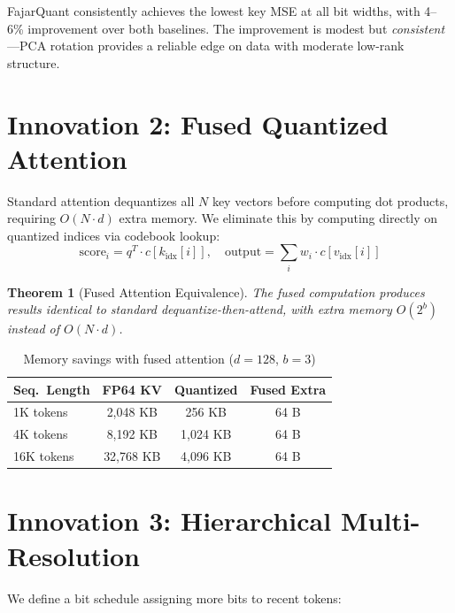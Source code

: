 \documentclass{article}
\newtheorem{theorem}{Theorem}
\begin{document}
FajarQuant consistently achieves the lowest key MSE at all bit widths, with 4--6\% improvement over both baselines. The improvement is modest but \textit{consistent}---PCA rotation provides a reliable edge on data with moderate low-rank structure.

\section{Innovation 2: Fused Quantized Attention}
\label{sec:fused}

Standard attention dequantizes all $N$ key vectors before computing dot products, requiring $O(N \cdot d)$ extra memory. We eliminate this by computing directly on quantized indices via codebook lookup:
\begin{equation}
\text{score}_i = q^T \cdot c[k_{\text{idx}}[i]], \quad
\text{output} = \sum_i w_i \cdot c[v_{\text{idx}}[i]]
\end{equation}

\begin{theorem}[Fused Attention Equivalence]
The fused computation produces results identical to standard dequantize-then-attend, with extra memory $O(2^b)$ instead of $O(N \cdot d)$.
\end{theorem}

\begin{table}[t]
\centering
\small
\caption{Memory savings with fused attention ($d{=}128$, $b{=}3$)}
\label{tab:memory}
\begin{tabular}{lccc}
\toprule
Seq.\ Length & FP64 KV & Quantized & Fused Extra \\
\midrule
1K tokens & 2,048 KB & 256 KB & 64 B \\
4K tokens & 8,192 KB & 1,024 KB & 64 B \\
16K tokens & 32,768 KB & 4,096 KB & 64 B \\
\bottomrule
\end{tabular}
\end{table}

\section{Innovation 3: Hierarchical Multi-Resolution}

We define a bit schedule assigning more bits to recent tokens:
\end{document}
